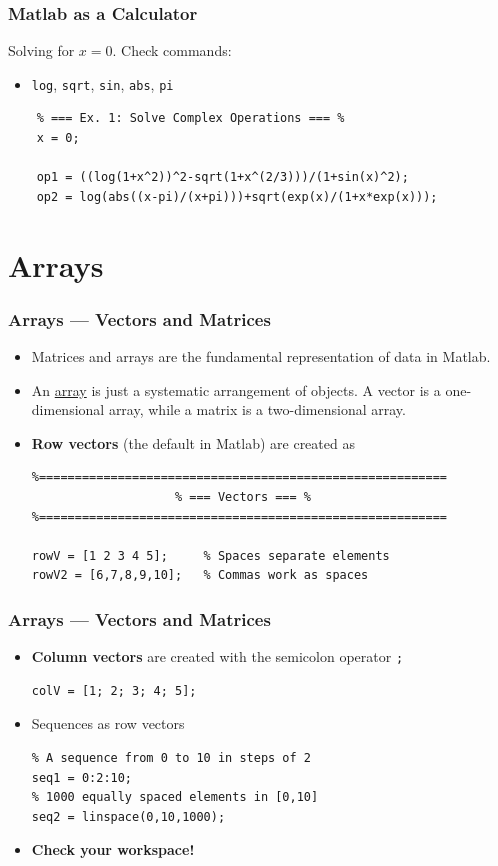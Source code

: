 \documentclass[11pt,xcolor={svgnames},aspectratio=169,usepdftitle=false,notheorems]{beamer}
\begin{document}
\begin{frame}[fragile]
    \frametitle{Matlab as a Calculator}
    Solving for $x = 0$. Check commands:
    \begin{itemize}
        \item \verb;log;, \verb;sqrt;, \verb;sin;, \verb;abs;, \verb;pi;
    \end{itemize}
\begin{lstlisting}
    % === Ex. 1: Solve Complex Operations === %
    x = 0;
    
    op1 = ((log(1+x^2))^2-sqrt(1+x^(2/3)))/(1+sin(x)^2);
    op2 = log(abs((x-pi)/(x+pi)))+sqrt(exp(x)/(1+x*exp(x)));
\end{lstlisting}
\end{frame}

\section{Arrays}

\begin{frame}[fragile]
    \frametitle{Arrays --- Vectors and Matrices}
\begin{itemize}
    \item Matrices and arrays are the fundamental representation of data in Matlab.
    \item An \href{https://en.wikipedia.org/wiki/Array}{array} is just a systematic arrangement of objects. A vector is a one-dimensional array, while a matrix is a two-dimensional array.
    \item \alert{\textbf{Row vectors}} (the default in Matlab) are created as
\begin{lstlisting}
%=========================================================
                    % === Vectors === %
%=========================================================

rowV = [1 2 3 4 5];     % Spaces separate elements
rowV2 = [6,7,8,9,10];   % Commas work as spaces
\end{lstlisting}
\end{itemize}
\end{frame}

\begin{frame}[fragile]
    \frametitle{Arrays --- Vectors and Matrices}
\begin{itemize}
    \item \alert{\textbf{Column vectors}} are created with the semicolon operator \verb+;+
\begin{lstlisting}
colV = [1; 2; 3; 4; 5];
\end{lstlisting}
    \item Sequences as row vectors
\begin{lstlisting}
% A sequence from 0 to 10 in steps of 2
seq1 = 0:2:10;
% 1000 equally spaced elements in [0,10]
seq2 = linspace(0,10,1000);
\end{lstlisting}
    \item \alert{\textbf{Check your workspace!}}
\end{itemize}
\end{frame}
\end{document}
